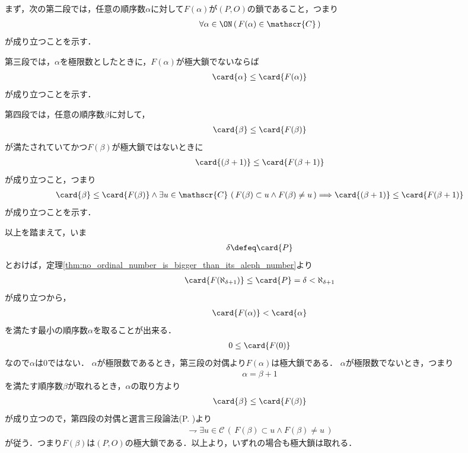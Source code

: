 \begin{sketch}
\begin{description}
				まず，次の第二段では，任意の順序数$\alpha$に対して$F(\alpha)$が$(P,O)$の鎖であること，つまり
				\begin{align}
					\forall \alpha \in \ON\, (\, F(\alpha) \in \mathscr{C}\, )
				\end{align}
				が成り立つことを示す．
				
				第三段では，$\alpha$を極限数としたときに，$F(\alpha)$が極大鎖でないならば
				\begin{align}
					\card{\alpha} \leq \card{F(\alpha)}
				\end{align}
				が成り立つことを示す．
				
				第四段では，任意の順序数$\beta$に対して，
				\begin{align}
					\card{\beta} \leq \card{F(\beta)}
				\end{align}
				が満たされていてかつ$F(\beta)$が極大鎖ではないときに
				\begin{align}
					\card{(\beta+1)} \leq \card{F(\beta+1)}
				\end{align}
				が成り立つこと，つまり
				\begin{align}
					\card{\beta} \leq \card{F(\beta)} \wedge
					\exists u \in \mathscr{C}\, \left(\, F(\beta) \subset u \wedge F(\beta) \neq u\, \right)
					\Longrightarrow \card{(\beta+1)} \leq \card{F(\beta+1)}
				\end{align}
				が成り立つことを示す．
				
				以上を踏まえて，いま
				\begin{align}
					\delta \defeq \card{P}
				\end{align}
				とおけば，定理\ref{thm:no_ordinal_number_is_bigger_than_its_aleph_number}より
				\begin{align}
					\card{F(\aleph_{\delta+1})} \leq \card{P}
					=\delta < \aleph_{\delta+1}
				\end{align}
				が成り立つから，
				\begin{align}
					\card{F(\alpha)} < \card{\alpha}
				\end{align}
				を満たす最小の順序数$\alpha$を取ることが出来る．
				\begin{align}
					0 \leq \card{F(0)}
				\end{align}
				なので$\alpha$は$0$ではない．
				$\alpha$が極限数であるとき，第三段の対偶より$F(\alpha)$は極大鎖である．
				$\alpha$が極限数でないとき，つまり
				\begin{align}
					\alpha = \beta+1
				\end{align}
				を満たす順序数$\beta$が取れるとき，$\alpha$の取り方より
				\begin{align}
					\card{\beta} \leq \card{F(\beta)}
				\end{align}
				が成り立つので，第四段の対偶と選言三段論法(P. \pageref{logicalthm:disjunctive_syllogism})より
				\begin{align}
					\rightharpoondown \exists u \in \mathscr{C}\, (\, F(\beta) \subset u \wedge F(\beta) \neq u\, )
				\end{align}
				が従う．つまり$F(\beta)$は$(P,O)$の極大鎖である．以上より，いずれの場合も極大鎖は取れる．
			

\end{description}
\end{sketch}
